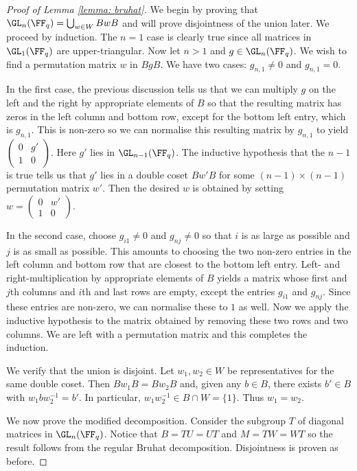 \documentclass[11pt]{amsart}
\theoremstyle{remark}
\begin{document}
\begin{proof}[Proof of Lemma \ref{lemma: bruhat}]
	We begin by proving that $\GL_n(\FF_q) = \bigcup_{w\in W} BwB$ and will prove disjointness of the union later.
	We proceed by induction.
	The $n=1$ case is clearly true since all matrices in $\GL_1(\FF_q)$ are upper-triangular.
	Now let $n>1$ and $g\in\GL_n(\FF_q)$.
	We wish to find a permutation matrix $w$ in $BgB$.
	We have two cases: $g_{n,1}\neq 0$ and $g_{n,1}=0$.

	In the first case, the previous discussion tells us that we can multiply $g$ on the left and the right by appropriate elements of $B$ so that the resulting matrix has zeros in the left column and bottom row, except for the bottom left entry, which is $g_{n,1}$.
	This is non-zero so we can normalise this resulting matrix by $g_{n,1}$ to yield $\left(\begin{smallmatrix} 0 & g' \\ 1 & 0 \end{smallmatrix}\right)$.
	Here $g'$ lies in $\GL_{n-1}(\FF_q)$.
	The inductive hypothesis that the $n-1$ is true tells us that $g'$ lies in a double coset $Bw'B$ for some $(n-1)\times(n-1)$ permutation matrix $w'$.
	Then the desired $w$ is obtained by setting $w = \left(\begin{smallmatrix} 0 & w' \\ 1 & 0 \end{smallmatrix}\right)$.

	In the second case, choose $g_{i1}\neq 0$ and $g_{nj}\neq 0$ so that $i$ is as large as possible and $j$ is as small as possible.
	This amounts to choosing the two non-zero entries in the left column and bottom row that are closest to the bottom left entry.
	Left- and right-multiplication by appropriate elements of $B$ yields a matrix whose first and $j$th columns and $i$th and last rows are empty, except the entries $g_{i1}$ and $g_{nj}$.
	Since these entries are non-zero, we can normalise these to $1$ as well.
	Now we apply the inductive hypothesis to the matrix obtained by removing these two rows and two columns.
	We are left with a permutation matrix and this completes the induction.

	We verify that the union is disjoint.
	Let $w_1,w_2\in W$ be representatives for the same double coset.
	Then $Bw_1B=Bw_2B$ and, given any $b\in B$, there exists $b'\in B$ with $w_1bw_2^{-1} = b'$.
	In particular, $w_1w_2^{-1}\in B\cap W = \{1\}$.
	Thus $w_1=w_2$.

	We now prove the modified decomposition.
	Consider the subgroup $T$ of diagonal matrices in $\GL_n(\FF_q)$.
	Notice that $B=TU=UT$ and $M=TW=WT$ so the result follows from the regular Bruhat decomposition.
	Disjointness is proven as before.
\end{proof}
\end{document}
